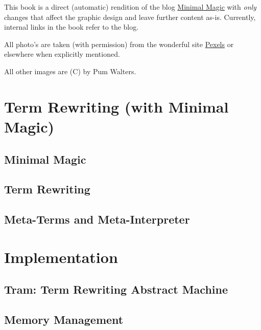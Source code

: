This book is a direct (automatic) rendition of the blog
\href{https://www.minimalmagic.blog/}{Minimal Magic} with \emph{only} changes that affect 
the graphic design and leave further content as-is. Currently, internal links 
in the book refer to the blog.

All photo's are taken (with permission) from the wonderful site \href{https://www.pexels.com}{Pexels} 
or elsewhere when explicitly mentioned.

All other images are (C) by Pum Walters.


\part{Term Rewriting (with Minimal Magic)}

\chapter{Minimal Magic}



\chapter{Term Rewriting}



\chapter{Meta-Terms and Meta-Interpreter}


\part{Implementation}


\chapter{Tram: Term Rewriting Abstract Machine}



\chapter{Memory Management}




